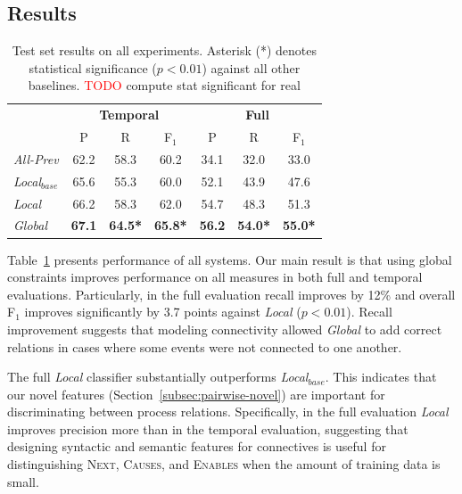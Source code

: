 \subsection{Results} \label{subsec:results}

\begin{table}[t]
{\footnotesize
\begin{tabular}{| l | c | c | c | c | c | c |}
\hline
    & \multicolumn{3}{c|}{\textbf{Temporal}} & \multicolumn{3}{c|}{\textbf{Full}} \\
    & P & R & F$_1$ & P & R & F$_1$ \\
\hline
\hline
\emph{All-Prev} & 62.2 & 58.3 & 60.2 & 34.1 & 32.0 & 33.0 \\
\emph{Local$_{base}$} & 65.6 & 55.3 & 60.0 &  52.1 & 43.9 & 47.6\\
\emph{Local} & 66.2 & 58.3 & 62.0 & 54.7 & 48.3 & 51.3 \\
\emph{Global} & \textbf{67.1} & \textbf{64.5*} & \textbf{65.8*} & \textbf{56.2} & \textbf{54.0*} & \textbf{55.0*} \\
\hline
\end{tabular}}
\caption{Test set results on all experiments. Asterisk (*) denotes statistical significance ($p<0.01$) against all other baselines. \textcolor{red}{TODO} compute stat significant for real}
\label{tab:results}
\end{table}

Table~\ref{tab:results} presents performance of all systems. Our main result is that using global constraints improves performance on all measures in both full and temporal evaluations. Particularly, in the full evaluation recall improves by 12\% and overall F$_1$ improves significantly by 3.7 points against \emph{Local} ($p<0.01$). Recall improvement suggests that modeling connectivity allowed \emph{Global} to add correct relations in cases where some events were not connected to one another.

The full \emph{Local} classifier substantially outperforms \emph{Local$_{base}$}. This indicates that our novel features (Section~\ref{subsec:pairwise-novel}) are important for discriminating between process relations. Specifically, in the full evaluation \emph{Local} improves precision more than in the temporal evaluation, suggesting that designing syntactic and semantic features for connectives is useful for distinguishing \textsc{Next}, \textsc{Causes}, and \textsc{Enables} when the amount of training data is small.

